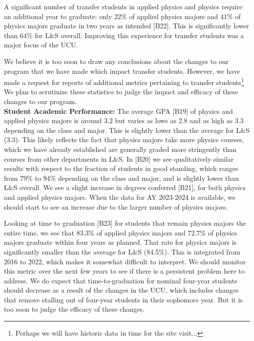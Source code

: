 \documentclass[12pt]{article}
\begin{document}
A significant number of transfer students in applied physics and
physics require an additional year to graduate: only $22\%$ of applied
physics majors and $41\%$ of physics majors graduate in two years as
intended [B22].  This is significantly lower than $64\%$ for L\&S overall.
Improving this experience for transfer students was a major focus of
the UCU.

We believe it is too soon to draw any conclusions about the changes to
our program that we have made which impact transfer students.
However, we have made a request for reports of additional metrics
pertaining to transfer students\footnote{Perhaps we will have historic
  data in time for the site visit...}  We plan to scrutinize these
statistics to judge the impact and efficacy of these changes to our
program.\\[3pt]

\noindent
{\bf Student Academic Performance:}
The average GPA [B19] of physics and applied physics majors is around
3.2 but varies as lows as 2.8 and as high as 3.3 depending on the
class and major.  This is slightly lower than the average for L\&S
(3.3).  This likely reflects the fact that physics majors take more
physics courses, which we have already established are generally
graded more stringently than courses from other departments in L\&S.
In [B20] we see qualitatively similar results with respect to the
fraction of students in good standing, which ranges from $79\%$ to
$94\%$ depending on the class and major, and is slightly lower than
L\&S overall.  We see a slight increase in degrees conferred [B21], for both physics
and applied physics majors.  When the data for AY 2023-2024 is
available, we should start to see an increase due to the larger number
of physics majors.

Looking at time to graduation [B23] for students that remain physics
majors the entire time, we see that $83.3\%$ of applied physics majors
and $72.7\%$ of physics majors graduate within four years as planned.
That rate for physics majors is significantly smaller than the average
for L\&S (84.5\%).  This is integrated from 2016 to 2022, which makes
it somewhat difficult to interpret.  We should monitor this metric
over the next few years to see if there is a persistent problem here
to address.  We do expect that time-to-graduation for nominal
four-year students should decrease as a result of the changes in the
UCU, which includes changes that remove stalling out of four-year
students in their sophomore year.  But it is too soon to judge the
efficacy of these changes.\\[3pt]
\end{document}
